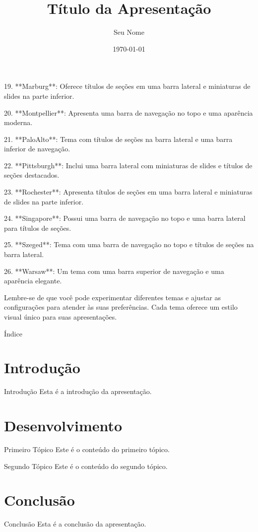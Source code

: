19. **Marburg**: Oferece títulos de seções em uma barra lateral e miniaturas de slides na parte inferior.

20. **Montpellier**: Apresenta uma barra de navegação no topo e uma aparência moderna.

21. **PaloAlto**: Tema com títulos de seções na barra lateral e uma barra inferior de navegação.

22. **Pittsburgh**: Inclui uma barra lateral com miniaturas de slides e títulos de seções destacados.

23. **Rochester**: Apresenta títulos de seções em uma barra lateral e miniaturas de slides na parte inferior.

24. **Singapore**: Possui uma barra de navegação no topo e uma barra lateral para títulos de seções.

25. **Szeged**: Tema com uma barra de navegação no topo e títulos de seções na barra lateral.

26. **Warsaw**: Um tema com uma barra superior de navegação e uma aparência elegante.

Lembre-se de que você pode experimentar diferentes temas e ajustar as configurações para atender às suas preferências. Cada tema oferece um estilo visual único para suas apresentações.
\title{Título da Apresentação}
\author{Seu Nome}
\date{\today}



\begin{frame}
  \titlepage
\end{frame}

\begin{frame}{Índice}
  \tableofcontents
\end{frame}

\section{Introdução}
\begin{frame}{Introdução}
  Esta é a introdução da apresentação.
\end{frame}

\section{Desenvolvimento}
\begin{frame}{Primeiro Tópico}
  Este é o conteúdo do primeiro tópico.
\end{frame}

\begin{frame}{Segundo Tópico}
  Este é o conteúdo do segundo tópico.
\end{frame}

\section{Conclusão}
\begin{frame}{Conclusão}
  Esta é a conclusão da apresentação.
\end{frame}


